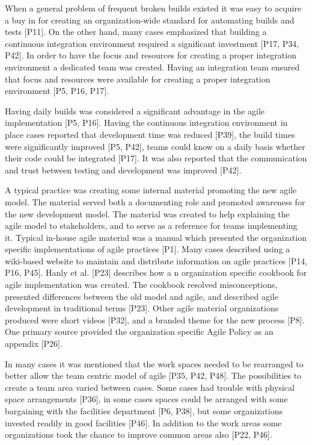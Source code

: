 \documentclass[preprint,authoryear,12pt]{elsarticle}
\begin{document}
When a general problem of frequent broken builds existed it was easy to acquire
a buy in for creating an organization-wide standard for automating builds and
tests [P11]. On the other hand, many cases emphasized that building a continuous
integration environment required a significant investment [P17, P34, P42].
In order to have the focus and resources for creating a proper integration
environment a dedicated team was created. Having an integration team ensured
that focus and resources were available for creating a proper integration
environment [P5, P16, P17].

Having daily builds was considered a significant advantage in the agile
implementation [P5, P16]. Having the continuous integration environment in place
cases reported that development time was reduced [P39], the build times were
significantly improved [P5, P42], teams could know on a daily basis whether
their code could be integrated [P17]. It was also reported that the
communication and trust between testing and development was improved [P42].


A typical practice was creating some internal material promoting the new agile
model. The material served both a documenting role and promoted awareness for
the new development model. The material was created to help explaining the agile
model to stakeholders, and to serve as a reference for teams implementing it.
Typical in-house agile material was a manual which presented the organization
specific implementations of agile practices [P1]. Many cases described using a
wiki-based website to maintain and distribute information on agile practices
[P14, P16, P45]. Hanly et al. [P23] describes how a n organization specific
cookbook for agile implementation was created. The cookbook resolved
misconceptions, presented differences between the old model and agile, and
described agile development in traditional terms [P23]. Other agile material
organizations produced were short videos [P32], and a branded theme for the new
process [P8]. One primary source provided the organization specific Agile Policy
as an appendix [P26].


In many cases it was mentioned that the work spaces needed to be rearranged to
better allow the team centric model of agile [P35, P42, P48]. The possibilities
to create a team area varied between cases. Some cases had trouble with physical
space arrangements [P36], in some cases spaces could be arranged with some
bargaining with the facilities department [P6, P38], but some organizations
invested readily in good facilities [P46]. In addition to the work areas some
organizations took the chance to improve common areas also [P22, P46].
\end{document}
